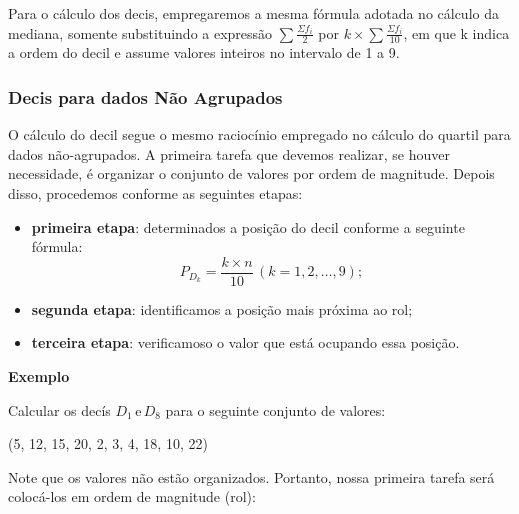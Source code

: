 Para o cálculo dos decis, empregaremos a mesma fórmula adotada no cálculo da mediana, somente substituindo a expressão \(\sum \frac{\Sigma f_i}{2}\) por \(k \times\sum \frac{\Sigma f_i}{10}\), em que k indica a ordem do decil e assume valores inteiros no intervalo de 1 a 9.

\subsubsection{Decis para dados Não Agrupados}

O cálculo do decil segue o mesmo raciocínio empregado no cálculo do quartil para dados não-agrupados. A primeira tarefa que devemos realizar, se houver necessidade, é organizar o conjunto de valores por ordem
de magnitude. Depois disso, procedemos conforme as seguintes etapas:

\begin{itemize}
    \item \textbf{primeira etapa}: determinados a posição do decil conforme a seguinte fórmula:
    \[
        P_{D_k}=\frac{k\times n}{10}\,(k=1,2,\dots, 9);
    \]
    \item \textbf{segunda etapa}: identificamos a posição mais próxima ao rol;
    \item \textbf{terceira etapa}: verificamoso o valor que está ocupando essa posição.
\end{itemize}

\textbf{Exemplo}

Calcular os decís \(D_1\,\text{e}\,  D_8\) para o seguinte conjunto de valores:
\begin{center}
    (5, 12, 15, 20, 2, 3, 4, 18, 10, 22)
\end{center}

Note que os valores não estão organizados. Portanto, nossa primeira tarefa será colocá-los em ordem de magnitude (rol):

